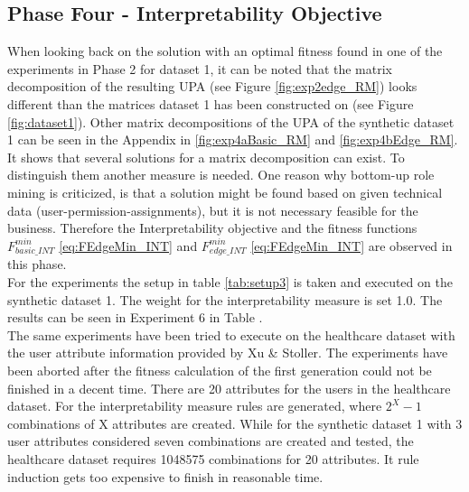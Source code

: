 \newpage
\subsection{Phase Four - Interpretability Objective}
\label{sec:phase4}
When looking back on the solution with an optimal fitness found in one of the experiments in Phase 2 for dataset 1, it can be noted that the matrix decomposition of the resulting UPA (see Figure \ref{fig:exp2edge_RM}) looks different than the matrices dataset 1 has been constructed on (see Figure \ref{fig:dataset1}). Other matrix decompositions of the UPA of the synthetic dataset 1 can be seen in the Appendix in \ref{fig:exp4aBasic_RM} and \ref{fig:exp4bEdge_RM}. It shows that several solutions for a matrix decomposition can exist. To distinguish them another measure is needed. One reason why bottom-up role mining is criticized, is that a solution might be found based on given technical data (user-permission-assignments), but it is not necessary feasible for the business. Therefore the Interpretability objective and the fitness functions
$F_{basic\_INT}^{min}$ \eqref{eq:FEdgeMin_INT} and $F_{edge\_INT}^{min}$ \eqref{eq:FEdgeMin_INT} are observed in this phase.\\
For the experiments the setup in table \ref{tab:setup3} is taken and executed on the synthetic dataset 1. The weight for the interpretability measure is set 1.0. The results can be seen in Experiment 6 in Table \label{tab:results_exp2_dataset1}.\\
The same experiments have been tried to execute on the healthcare dataset with the user attribute information provided by Xu \& Stoller\cite{Xu}. The experiments have been aborted after the fitness calculation of the first generation could not be finished in a decent time. There are 20 attributes for the users in the healthcare dataset. For the interpretability measure rules are generated, where $2^X-1$ combinations of X attributes are created. While for the synthetic dataset 1 with 3 user attributes considered seven combinations are created and tested, the healthcare dataset requires 1048575 combinations for 20 attributes. It rule induction gets too expensive to finish in reasonable time.